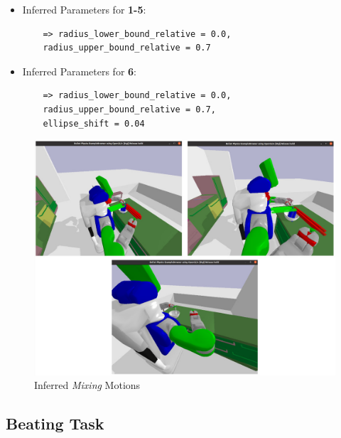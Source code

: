 \begin{itemize}
  \item Inferred Parameters for \textbf{1-5}: 
   \begin{lstlisting}
    => radius_lower_bound_relative = 0.0, 
    radius_upper_bound_relative = 0.7
  \end{lstlisting}
  \item Inferred Parameters for \textbf{6}:
  \begin{lstlisting}
    => radius_lower_bound_relative = 0.0, 
    radius_upper_bound_relative = 0.7,
    ellipse_shift = 0.04
  \end{lstlisting}
\end{itemize}

\begin{figure}[H]
  \centering
  \includegraphics[scale=0.35]{Graphics/mixing_evaluation.jpg}
  \caption{Inferred \textit{Mixing} Motions}
  \label{fig:mixingverb WikiHow}
\end{figure}

\subsection*{Beating Task}

